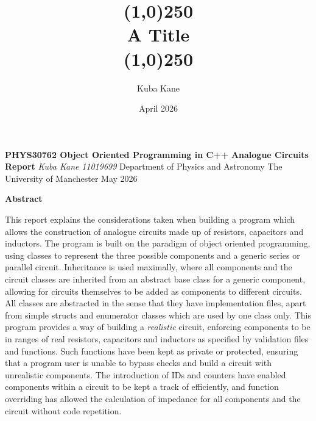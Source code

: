 \documentclass[11pt, letterpaper]{article}
\title{\line(1,0){250}\\A Title\\\line(1,0){250}}
\author{Kuba Kane}
\date{April 2026}
\begin{document}
\begin{titlepage}
    \begin{center}
        \vspace*{1.5cm}

        \normalsize \textbf{PHYS30762 Object Oriented Programming in C++}
        \vspace{0.5cm}
        \linebreak \Large \textbf{Analogue Circuits Report}
        \vspace{2cm}
        \linebreak \normalsize \textit{} 
        \linebreak \textit{Kuba Kane}
	\linebreak \textit{11019699}
        \vspace{12pt}
        \vspace{12pt}
        \linebreak Department of Physics and Astronomy
        \linebreak The University of Manchester
        \vspace{12pt}
        \vspace{12pt}
        \linebreak May 2026
        \vspace{\fill}
    \end{center}
    \vspace{3cm}

	\textbf{Abstract}
    
	\vspace{12pt} This report explains the considerations taken when building a program which allows the construction of analogue circuits made up of resistors, capacitors and inductors. The program is built on the paradigm of object oriented programming, using classes to represent the three possible components and a generic series or parallel circuit. Inheritance is used maximally, where all components and the circuit classes are inherited from an abstract base class for a generic component, allowing for circuits themselves to be added as components to different circuits. All classes are abstracted in the sense that they have implementation files, apart from simple structs and enumerator classes which are used by one class only. This program provides a way of building a \textit{realistic} circuit, enforcing components to be in ranges of real resistors, capacitors and inductors as specified by validation files and functions. Such functions have been kept as private or protected, ensuring that a program user is unable to bypass checks and build a circuit with unrealistic components. The introduction of IDs and counters have enabled components within a circuit to be kept a track of efficiently, and function overriding has allowed the calculation of impedance for all components and the circuit without code repetition.
    
    \vspace{\fill}
    
\end{titlepage}
\end{document}
